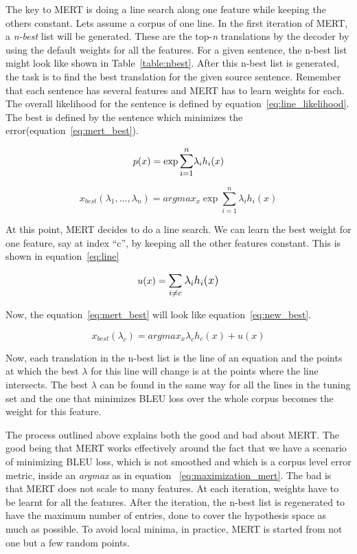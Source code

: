 The key to MERT is doing a line search along one feature while keeping the others constant. Lets assume a corpus of one line. In the first iteration of MERT, a \emph{n-best} list will be generated. These are the top-\emph{n} translations by the decoder by using the default weights for all the features. For a given sentence, the n-best list might look like shown in Table~\ref{table:nbest}. After this n-best list is generated, the task is to find the best translation for the given source sentence. Remember that each sentence has several features and MERT has to learn weights for each. The overall likelihood for the sentence is defined by equation~\eqref{eq:line_likelihood}. The best is defined by the sentence which minimizes the error(equation~\eqref{eq:mert_best}). 

\begin{equation} \label{eq:line_likelihood}
	p(x) = \exp\mathlarger{\sum_{i=1}^n}\lambda_{i}h_{i}(x)
\end{equation}

\begin{equation} \label{eq:mert_best}
	x_{best}(\lambda_{1}, ..., \lambda_{n}) = argmax_{x}\exp\sum_{i=1}^n \lambda_{i}h_{i}(x)
\end{equation}

At this point, MERT decides to do a line search. We can learn the best weight for one feature, say at index ``c'', by keeping all the other features constant. This is shown in equation~\eqref{eq:line}


\begin{equation} \label{eq:line}
	u(x) = \mathlarger{\sum_{i \neq c}\lambda_{i}h_{i}(x)}
\end{equation}

Now, the equation~\eqref{eq:mert_best} will look like equation~\eqref{eq:new_best}. 

\begin{equation} \label{eq:new_best}
	x_{best}(\lambda_{c}) = argmax_{x} \lambda_{c}h_{c}(x) + u(x)
\end{equation} 

Now, each translation in the n-best list is the line of an equation and the points at which the best $\lambda$ for this line will change is at the points where the line intersects. The best $\lambda$ can be found in the same way for all the lines in the tuning set and the one that minimizes BLEU loss over the whole corpus becomes the weight for this feature. 

The process outlined above explains both the good and bad about MERT. The good being that MERT works effectively around the fact that we have a scenario of minimizing BLEU loss, which is not smoothed and which is a corpus level error metric, inside an \emph{argmax} as in equation ~\eqref{eq:maximization_mert}. The bad is that MERT does not scale to many features. At each iteration, weights have to be learnt for all the features. After the iteration, the n-best list is regenerated to have the maximum number of entries, done to cover the hypothesis space as much as possible. To avoid local minima, in practice, MERT is started from not one but a few random points.




